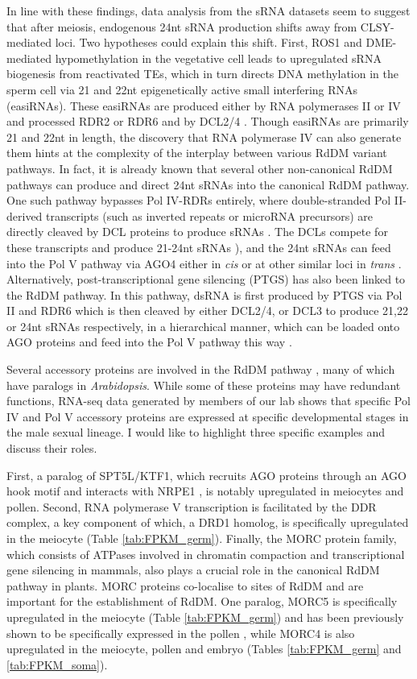 In line with these findings, data analysis from the sRNA datasets seem to suggest that after meiosis, endogenous 24nt sRNA production shifts away from CLSY-mediated loci. Two hypotheses could explain this shift. First, ROS1 and DME-mediated hypomethylation in the vegetative cell leads to upregulated sRNA biogenesis from reactivated TEs, which in turn directs DNA methylation in the sperm cell \citep{RN57,RN39} via 21 and 22nt epigenetically active small interfering RNAs (easiRNAs). These easiRNAs are produced either by RNA polymerases II or IV and processed RDR2 or RDR6 and by DCL2/4 \citep{RN75}. Though easiRNAs are primarily 21 and 22nt in length, the discovery that RNA polymerase IV can also generate them hints at the complexity of the interplay between various RdDM variant pathways. In fact, it is already known that several other non-canonical RdDM pathways can produce and direct 24nt sRNAs into the canonical RdDM pathway. One such pathway bypasses Pol IV-RDRs entirely, where double-stranded Pol II-derived transcripts (such as inverted repeats or microRNA precursors) are directly cleaved by DCL proteins to produce sRNAs \citep{RN269}. The DCLs compete for these transcripts and produce 21-24nt sRNAs \citep{RN268}), and the 24nt sRNAs can feed into the Pol V pathway via AGO4 either in \textit{cis} or at other similar loci in \textit{trans} \citep{RN270,RN269}. Alternatively, post-transcriptional gene silencing (PTGS) has also been linked to the RdDM pathway. In this pathway, dsRNA is first produced by PTGS via Pol II and RDR6 which is then cleaved by either DCL2/4, or DCL3 to produce 21,22 or 24nt sRNAs respectively, in a hierarchical manner\citep{RN267}, which can be loaded onto AGO proteins and feed into the Pol V pathway this way \citep{RN133}. 

Several accessory proteins are involved in the RdDM pathway \citep{RN33}, many of which have paralogs in \textit{Arabidopsis}. While some of these proteins may have redundant functions, RNA-seq data generated by members of our lab shows that specific Pol IV and Pol V accessory proteins are expressed at specific developmental stages in the male sexual lineage. I would like to highlight three specific examples and discuss their roles. 

 First, a paralog of SPT5L/KTF1, which recruits AGO proteins through an AGO hook motif \citep{RN121,RN273}  and interacts with NRPE1 \citep{RN271,RN272}, is notably upregulated in meiocytes and pollen. Second, RNA polymerase V transcription is facilitated by the DDR complex, a key component of which, a DRD1 homolog, is specifically upregulated in the meiocyte (Table \ref{tab:FPKM_germ}). Finally, the MORC protein family, which consists of ATPases involved in chromatin compaction and transcriptional gene silencing in mammals, also plays a crucial role in the canonical RdDM pathway in plants. MORC proteins co-localise to sites of RdDM and are important for the establishment of RdDM. One paralog, MORC5 is specifically upregulated in the meiocyte (Table \ref{tab:FPKM_germ}) and has been previously shown to be specifically expressed in the pollen \citep{RN274}, while MORC4 is also upregulated in the meiocyte, pollen and embryo (Tables \ref{tab:FPKM_germ} and \ref{tab:FPKM_soma}).

